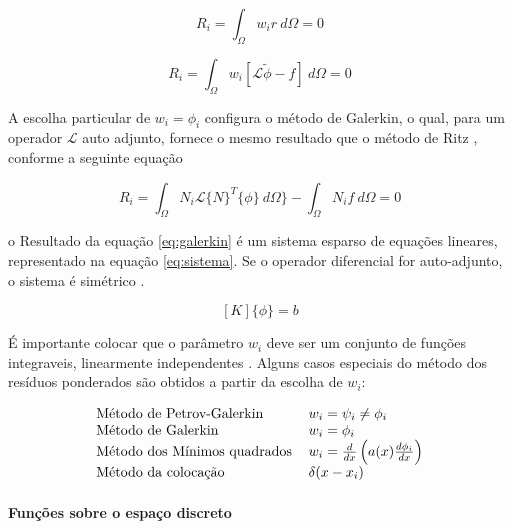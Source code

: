   \begin{equation}
  	\label{eq:res1}
 	R_i = \int_{\Omega}{w_i r \ d\Omega} = 0
  \end{equation}
  
  \begin{equation}
  	\label{eq:res2}
 	R_i = \int_{\Omega}{w_i [\mathcal{L} \tilde{\phi} - f] \ d\Omega} = 0
  \end{equation}  


A escolha particular de $w_i = \phi_i$ configura o método de Galerkin, o qual, para um operador $\mathcal{L}$ auto adjunto, fornece o mesmo resultado que o método de Ritz  \citep[p. 22]{jin}, conforme a seguinte equação

  \begin{equation}
  	\label{eq:galerkin}
 	R_i = 
 	\int_{\Omega}{N_i \mathcal{L} \{N\}^T \{\phi\} \ d\Omega\}} - \int_{\Omega}{N_i f \ d \Omega} = 0
  \end{equation}  
  
  
  o Resultado da equação \ref{eq:galerkin} é um sistema esparso de equações lineares, representado na equação \ref{eq:sistema}. Se o operador diferencial for auto-adjunto, o sistema é simétrico \citep[p. 36]{volakis}.
  
    \begin{equation}
    	\label{eq:sistema}
		[K]\{\phi\} = {b}
    \end{equation}  

É importante colocar que o parâmetro $w_i$ deve ser um conjunto de funções integraveis, linearmente independentes
\citep[p. 60]{reddy}. Alguns casos especiais do método dos resíduos ponderados são obtidos a partir da escolha de $w_i$:

\begin{equation}
\label{eq:metPond}
	\begin{tabular}{ l l }
	Método de Petrov-Galerkin & $ w_i = \psi_i \neq \phi_i $ \\ 
	Método de Galerkin & $ w_i = \phi_i $\\  
	Método dos Mínimos quadrados & $ w_i = \frac{d}{dx} \left(a(x)\frac{d \phi_i}{dx}\right) $ \\ 
	Método da colocação & $ \delta(x - x_i)  $ 
	\end{tabular}
\end{equation}



\paragraph{Funções sobre o espaço discreto \\}

